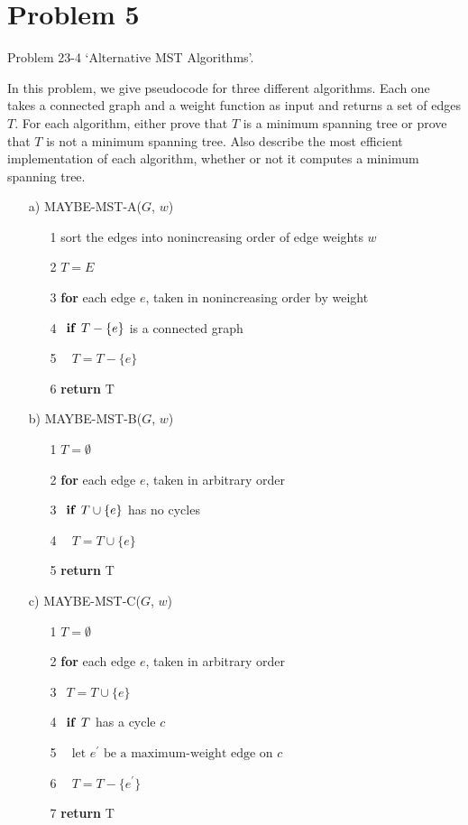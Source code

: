 \documentclass[a4paper, 11pt]{article}
\begin{document}
\section*{Problem 5}

Problem 23-4 `Alternative MST Algorithms'.

In this problem, we give pseudocode for three different algorithms. Each one takes a connected graph and a weight function as input and returns a set of edges $T$. For each algorithm, either prove that $T$ is a minimum spanning tree or prove that $T$ is not a minimum spanning tree. Also describe the most efficient implementation of each algorithm, whether or not it computes a minimum spanning tree.

\begin{itemize}
	\item [a)] MAYBE-MST-A($G$, $w$)
	\begin{itemize}
		\item[1] sort the edges into nonincreasing order of edge weights $w$
		\item[2] $T = E$
		\item[3] \textbf{for} each edge $e$, taken in nonincreasing order by weight
		\item[4] $\>\> \text{\textbf{if }}T - \{e\}$ is a connected graph
		\item[5] $\>\>\>\> T = T - \{e\}$
		\item[6] \textbf{return} T
	\end{itemize}
	
	\item [b)] MAYBE-MST-B($G$, $w$)
	\begin{itemize}
		\item[1] $T = \emptyset$
		\item[2] \textbf{for} each edge $e$, taken in arbitrary order
		\item[3] $\>\> \text{\textbf{if }}T \cup \{e\}$ has no cycles
		\item[4] $\>\>\>\> T = T \cup \{e\}$
		\item[5] \textbf{return} T
	\end{itemize}

	\item [c)] MAYBE-MST-C($G$, $w$)
	\begin{itemize}
		\item[1] $T = \emptyset$
		\item[2] \textbf{for} each edge $e$, taken in arbitrary order
		\item[3] $\>\> T = T \cup \{e\}$
		\item[4] $\>\> \text{\textbf{if }}T$ has a cycle $c$
		\item[5] $\>\>\>\> \text{let $e^{'}$ be a maximum-weight edge on $c$}$
		\item[6] $\>\>\>\> T = T - \{e^{'}\}$
		\item[7] \textbf{return} T
	\end{itemize}
\end{itemize}
\end{document}
